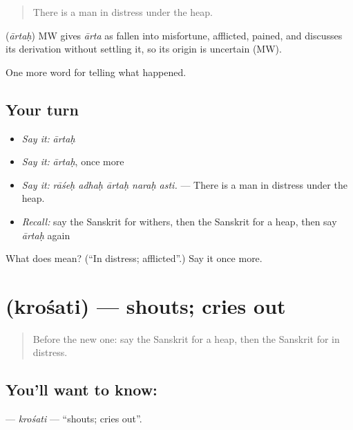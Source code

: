 \begin{quote}
There is a man in distress under the heap.
\end{quote}

\begin{cousinweb}
\textbf{} (\emph{ārtaḥ}) MW gives \emph{ārta} as fallen into misfortune, afflicted, pained, and discusses its derivation without settling it, so its origin is uncertain (MW).
\end{cousinweb}

\begin{grammarlens}[title={What you've built}]
One more word for telling what happened.
\end{grammarlens}

\subsection*{Your turn}
\begin{itemize}
\raggedright
  \item \emph{Say it:} \emph{ārtaḥ}
  \item \emph{Say it:} \emph{ārtaḥ}, once more
  \item \emph{Say it:} \emph{rāśeḥ adhaḥ ārtaḥ naraḥ asti.} — There is a man in distress under the heap.
  \item \emph{Recall:} say the Sanskrit for withers, then the Sanskrit for a heap, then say \emph{ārtaḥ} again
\end{itemize}

\begin{tcolorbox}[breakable,colback=teal!4,colframe=teal!35!black,title={Before you move on}]
What does  mean? (\textquotedblleft{}In distress; afflicted\textquotedblright{}.) Say it once more.
\end{tcolorbox}
\section[\texorpdfstring{\sk{क्रोशति} (krośati)}{क्रोशति (krośati)}]{ (krośati) — shouts; cries out}

\label{lesson:SA-C304-krosati}



\begin{quote}
Before the new one: say the Sanskrit for a heap, then the Sanskrit for in distress.
\end{quote}

\subsection*{You'll want to know: }
\textbf{} — \emph{krośati} — \textquotedblleft{}shouts; cries out\textquotedblright{}.

